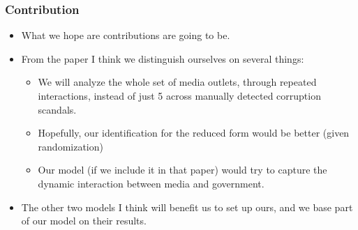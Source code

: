\documentclass[10pt,aspectratio=169]{beamer}
\begin{document}
\begin{frame}
\frametitle{Contribution}
\small
\begin{itemize}
    \item What we hope are contributions are going to be. 
    \item From the \cite{MediaCapture} paper I think we distinguish ourselves on several things: 
    \begin{itemize}
        \item We will analyze the whole set of media outlets, through repeated interactions, instead of just 5 across manually detected corruption scandals. 
        \item Hopefully, our identification for the reduced form would be better (given randomization)
        \item Our model (if we include it in that paper) would try to capture the dynamic interaction between media and government.
    \end{itemize}
    \item The other two models I think will benefit us to set up ours, and we base part of our model on their results.
\end{itemize}

\end{frame}
\end{document}
